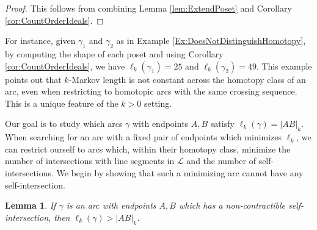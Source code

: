 \documentclass[12pt, letterpaper,table]{amsart}
\newtheorem{lemma}[theorem]{Lemma}
\theoremstyle{remark}
\begin{document}
\begin{proof}
This follows from combining Lemma \ref{lem:ExtendPoset}  and Corollary \ref{cor:CountOrderIdeals}.
\end{proof}

For instance, given $\gamma_1$ and $\gamma_2$ as in Example \ref{Ex:DoesNotDistinguishHomotopy}, by computing the shape of each poset and using Corollary \ref{cor:CountOrderIdeals}, we have $\ell_k(\gamma_1) = 25$ and $\ell_k(\gamma_2) = 49$.  This example points out that $k$-Markov length is not constant across the homotopy class of an arc, even when restricting to homotopic arcs with the same crossing sequence. This is a unique feature of the $k > 0$ setting.

Our goal is to study which arcs $\gamma$ with endpoints $A,B$ satisfy $\ell_k(\gamma) = \vert AB \vert_k$. When searching for an arc with a fixed pair of endpoints which minimizes $\ell_k$, we can restrict ourself to arcs which, within their homotopy class, minimize the number of intersections with line segments in $\mathcal{L}$ and the number of self-intersections. We begin by showing that such a minimizing arc cannot have any self-intersection. 

\begin{lemma}\label{lem:SelfIntNotMinimal}
If $\gamma$ is an arc with endpoints $A,B$ which has a non-contractible self-intersection, then $\ell_k(\gamma) > \vert AB \vert_k$.
\end{lemma}
\end{document}
